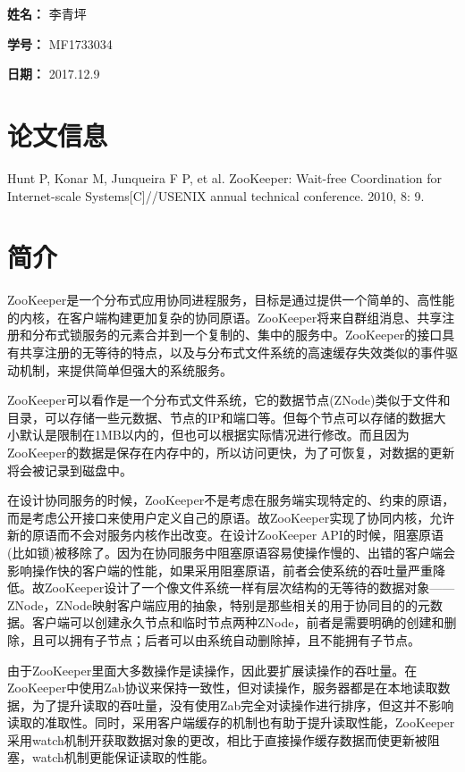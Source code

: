 \documentclass[UTF8]{article}
\begin{document}
    
{\flushleft \bf \Large 姓名：} 李青坪

{\flushleft \bf \Large 学号：} MF1733034

{\flushleft \bf \Large 日期：} 2017.12.9


\section*{论文信息}
    
Hunt P, Konar M, Junqueira F P, et al. ZooKeeper: Wait-free Coordination for Internet-scale Systems[C]//USENIX annual technical conference. 2010, 8: 9.

    
\section{简介}

ZooKeeper是一个分布式应用协同进程服务，目标是通过提供一个简单的、高性能的内核，在客户端构建更加复杂的协同原语。ZooKeeper将来自群组消息、共享注册和分布式锁服务的元素合并到一个复制的、集中的服务中。ZooKeeper的接口具有共享注册的无等待的特点，以及与分布式文件系统的高速缓存失效类似的事件驱动机制，来提供简单但强大的系统服务。

ZooKeeper可以看作是一个分布式文件系统，它的数据节点(ZNode)类似于文件和目录，可以存储一些元数据、节点的IP和端口等。但每个节点可以存储的数据大小默认是限制在1MB以内的，但也可以根据实际情况进行修改。而且因为ZooKeeper的数据是保存在内存中的，所以访问更快，为了可恢复，对数据的更新将会被记录到磁盘中。

在设计协同服务的时候，ZooKeeper不是考虑在服务端实现特定的、约束的原语，而是考虑公开接口来使用户定义自己的原语。故ZooKeeper实现了协同内核，允许新的原语而不会对服务内核作出改变。在设计ZooKeeper API的时候，阻塞原语(比如锁)被移除了。因为在协同服务中阻塞原语容易使操作慢的、出错的客户端会影响操作快的客户端的性能，如果采用阻塞原语，前者会使系统的吞吐量严重降低。故ZooKeeper设计了一个像文件系统一样有层次结构的无等待的数据对象——ZNode，ZNode映射客户端应用的抽象，特别是那些相关的用于协同目的的元数据。客户端可以创建永久节点和临时节点两种ZNode，前者是需要明确的创建和删除，且可以拥有子节点；后者可以由系统自动删除掉，且不能拥有子节点。

由于ZooKeeper里面大多数操作是读操作，因此要扩展读操作的吞吐量。在ZooKeeper中使用Zab协议来保持一致性，但对读操作，服务器都是在本地读取数据，为了提升读取的吞吐量，没有使用Zab完全对读操作进行排序，但这并不影响读取的准取性。同时，采用客户端缓存的机制也有助于提升读取性能，ZooKeeper采用watch机制开获取数据对象的更改，相比于直接操作缓存数据而使更新被阻塞，watch机制更能保证读取的性能。
\end{document}
